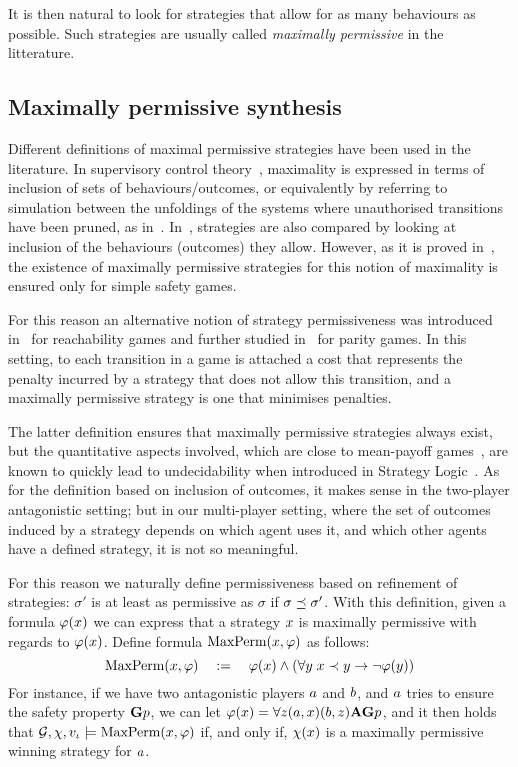 It is then natural to look for  strategies that allow for as many
behaviours as possible. Such strategies are usually called
\emph{maximally permissive} in the litterature.


\subsection{Maximally permissive synthesis}
\label{sec-max-perm}

Different definitions of maximal permissive strategies have been used
in the literature. In supervisory control
theory~\cite{ramadge1987supervisory}, maximality is expressed in terms
of inclusion of sets of behaviours/outcomes, or equivalently by
referring to simulation between the unfoldings of the systems where
unauthorised transitions have been pruned, as
in~\cite{pinchinat2005you}.  In~\cite{bernet2002permissive},
strategies are also compared by looking at inclusion of the behaviours
(outcomes) they allow. However, as it is proved
in~\cite{bernet2002permissive}, the existence of maximally permissive
strategies for this notion of maximality is ensured only for simple
safety games.

For this reason an alternative notion of strategy
permissiveness was introduced in~\cite{bouyer2009measuring} for
reachability games and further studied in~\cite{bouyer2011measuring}
for parity games. In this setting, to each transition in a game is
attached a cost that represents the penalty incurred by a strategy
that does not allow this transition, and a maximally permissive
strategy is one that minimises penalties.

The latter definition ensures that
maximally permissive strategies always exist, but the quantitative
aspects involved, which are close to mean-payoff
games~\cite{ehrenfeucht1979positional,gurvich1988cyclic}, are known to
quickly lead to undecidability when introduced in Strategy Logic~\cite{gardy2017semantics}.
As for the definition based on inclusion of outcomes, it makes sense in the
two-player antagonistic setting; but in our multi-player setting, where the set of
outcomes induced by a strategy depends on which agent uses it, and
which other agents have a defined strategy, it is not so meaningful.

For this reason we naturally define permissiveness based on refinement
of strategies: $\sigma'$ is at least as permissive as $\sigma$ if $\sigma\refines\sigma'$.
With this definition, given a formula $\phi(\var)$ we can express that a strategy $\var$
  is maximally permissive with regards to  $\phi(\var)$. Define formula $\maxperm(\var,\phi)$ as
  follows:
  \[\maxperm(\var,\phi) \quad := \quad \phi(\var) \wedge (\forall \varb \;
    \var \refinesstr \varb \impl \neg \phi(\varb))\]
  For instance, if we have two antagonistic players $\ag$ and $\agb$,
  and $\ag$ tries to ensure the safety property $\always p$, we can let $\phi(\var)=\forall \varc
  \bind[\ag]{\var}\bind[\agb]{\varc}\A\always p$, and it then holds that
  $\CGS,\assign,\pos_\init\models \maxperm(\var,\phi)$ if, and only
  if, $\assign(\var)$ is a maximally permissive winning strategy for $\ag$.


